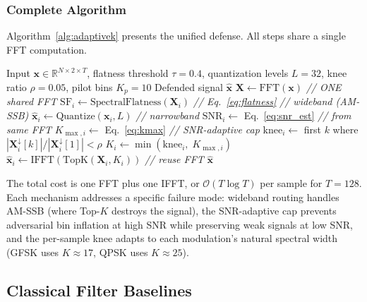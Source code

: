 \subsubsection{Complete Algorithm}

Algorithm~\ref{alg:adaptivek} presents the unified defense.  All steps share
a single FFT computation.

\begin{algorithm}[t]
\caption{Adaptive-K v2: Unified Spectral Defense}
\label{alg:adaptivek}
\begin{algorithmic}[1]
\Require Input $\mathbf{x} \in \mathbb{R}^{N \times 2 \times T}$,
  flatness threshold $\tau = 0.4$, quantization levels $L = 32$,
  knee ratio $\rho = 0.05$, pilot bins $K_p = 10$
\Ensure Defended signal $\hat{\mathbf{x}}$
\State $\mathbf{X} \leftarrow \text{FFT}(\mathbf{x})$
  \hfill \textit{// ONE shared FFT}
  \State $\text{SF}_i \leftarrow \text{SpectralFlatness}(\mathbf{X}_i)$
    \hfill \textit{// Eq.~\eqref{eq:flatness}}
    \hfill \textit{// wideband (AM-SSB)}
    \State $\hat{\mathbf{x}}_i \leftarrow \text{Quantize}(\mathbf{x}_i, L)$
  \Else
    \hfill \textit{// narrowband}
    \State $\widehat{\text{SNR}}_i \leftarrow$ Eq.~\eqref{eq:snr_est}
      \hfill \textit{// from same FFT}
    \State $K_{\max,i} \leftarrow$ Eq.~\eqref{eq:kmax}
      \hfill \textit{// SNR-adaptive cap}
    \State $\text{knee}_i \leftarrow$ first $k$ where $|\mathbf{X}_i^{\downarrow}[k]| / |\mathbf{X}_i^{\downarrow}[1]| < \rho$
    \State $K_i \leftarrow \min(\text{knee}_i,\; K_{\max,i})$
    \State $\hat{\mathbf{x}}_i \leftarrow \text{IFFT}(\mathrm{TopK}(\mathbf{X}_i, K_i))$
      \hfill \textit{// reuse FFT}
  \EndIf
\EndFor
\State \Return $\hat{\mathbf{x}}$
\end{algorithmic}
\end{algorithm}

The total cost is one FFT plus one IFFT, or $\mathcal{O}(T \log T)$ per
sample for $T = 128$.  Each mechanism addresses a specific failure mode:
wideband routing handles AM-SSB (where Top-$K$ destroys the signal),
the SNR-adaptive cap prevents adversarial bin inflation at high SNR while
preserving weak signals at low SNR, and the per-sample knee adapts to each
modulation's natural spectral width (GFSK uses $K \approx 17$, QPSK
uses $K \approx 25$).

\subsection{Classical Filter Baselines}
\label{sec:classical}

